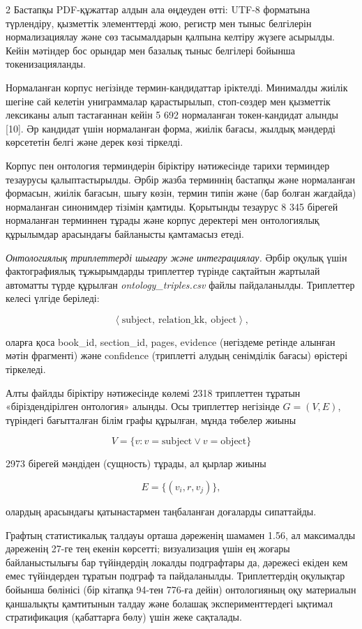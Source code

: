 \begin{multicols}{2}
Бастапқы PDF-құжаттар алдын ала өңдеуден өтті: UTF-8 форматына
түрлендіру, қызметтік элементтерді жою, регистр мен тыныс белгілерін
нормализациялау және сөз тасымалдарын қалпына келтіру жүзеге асырылды.
Кейін мәтіндер бос орындар мен базалық тыныс белгілері бойынша
токенизацияланды.

Нормаланған корпус негізінде термин-кандидаттар іріктелді. Минималды
жиілік шегіне сай келетін униграммалар қарастырылып, стоп-сөздер мен
қызметтік лексиканы алып тастағаннан кейін 5 692 нормаланған
токен-кандидат алынды {[}10{]}. Әр кандидат үшін нормаланған форма,
жиілік бағасы, жылдық мәндерді көрсететін белгі және дерек көзі
тіркелді.

Корпус пен онтология терминдерін біріктіру нәтижесінде тарихи терминдер
тезаурусы қалыптастырылды. Әрбір жазба терминнің бастапқы және
нормаланған формасын, жиілік бағасын, шығу көзін, термин типін және (бар
болған жағдайда) нормаланған синонимдер тізімін қамтиды. Қорытынды
тезаурус 8 345 бірегей нормаланған терминнен тұрады және корпус
деректері мен онтологиялық құрылымдар арасындағы байланысты қамтамасыз
етеді.

\emph{Онтологиялық триплеттерді шығару және интеграциялау.} Әрбір оқулық
үшін фактографиялық тұжырымдарды триплеттер түрінде сақтайтын жартылай
автоматты түрде құрылған \emph{ontology\_triples.csv} файлы
пайдаланылды. Триплеттер келесі үлгіде беріледі:

\[\left\langle \text{subject},\text{ relation\_kk},\text{ object} \right\rangle,\]

оларға қоса book\_id, section\_id, pages, evidence (негіздеме ретінде
алынған мәтін фрагменті) және confidence (триплетті алудың сенімділік
бағасы) өрістері тіркеледі.

Алты файлды біріктіру нәтижесінде көлемі 2318 триплеттен тұратын
«біріздендірілген онтология» алынды. Осы триплеттер негізінде
\(G = (V,E)\), түріндегі бағытталған білім графы құрылған, мұнда төбелер
жиыны

\[V = \{ v:v = \text{subject} \vee v = \text{object}\}\]

2973 бірегей мәндіден (сущность) тұрады, ал қырлар жиыны

\[E = \{(v_{i},r,v_{j})\},\]

олардың арасындағы қатынастармен таңбаланған доғаларды сипаттайды.

Графтың статистикалық талдауы орташа дәреженің шамамен 1.56, ал
максималды дәреженің 27-ге тең екенін көрсетті; визуализация үшін ең
жоғары байланыстылығы бар түйіндердің локалды подграфтары да, дәрежесі
екіден кем емес түйіндерден тұратын подграф та пайдаланылды.
Триплеттердің оқулықтар бойынша бөлінісі (бір кітапқа 94-тен 776-ға
дейін) онтологияның оқу материалын қаншалықты қамтитынын талдау және
болашақ эксперименттердегі ықтимал стратификация (қабаттарға бөлу) үшін
жеке сақталады.


\end{multicols}
